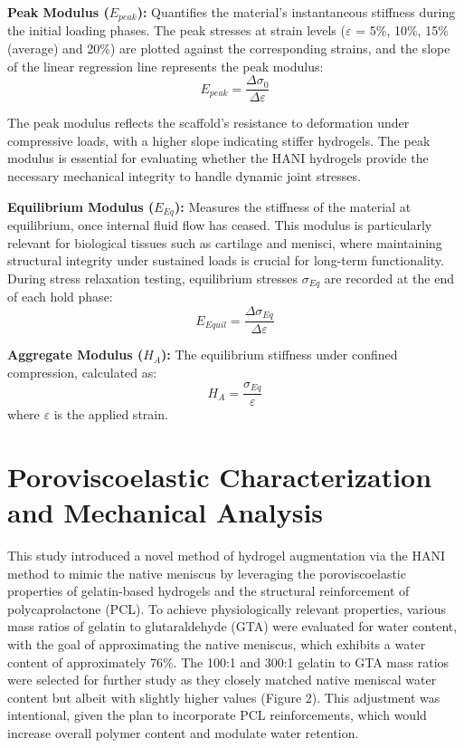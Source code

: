 \textbf{Peak Modulus ($E_{peak}$):} Quantifies the material's instantaneous stiffness during the initial loading phases. The peak stresses at strain levels ($\varepsilon$ = 5\%, 10\%, 15\%(average) and 20\%) are plotted against the corresponding strains, and the slope of the linear regression line represents the peak modulus:
\begin{equation}
E_{peak} = \frac{\Delta\sigma_{0}}{\Delta\varepsilon}
\end{equation}

The peak modulus reflects the scaffold's resistance to deformation under compressive loads, with a higher slope indicating stiffer hydrogels. The peak modulus is essential for evaluating whether the HANI hydrogels provide the necessary mechanical integrity to handle dynamic joint stresses.

\textbf{Equilibrium Modulus ($E_{Eq}$):} Measures the stiffness of the material at equilibrium, once internal fluid flow has ceased. This modulus is particularly relevant for biological tissues such as cartilage and menisci, where maintaining structural integrity under sustained loads is crucial for long-term functionality. During stress relaxation testing, equilibrium stresses $\sigma_{Eq}$ are recorded at the end of each hold phase:
\begin{equation}
E_{Equil} = \frac{\Delta\sigma_{Eq}}{\Delta\varepsilon}
\end{equation}

\textbf{Aggregate Modulus ($H_A$):} The equilibrium stiffness under confined compression, calculated as:
\begin{equation}
H_A = \frac{\sigma_{Eq}}{\varepsilon}
\end{equation}
where $\varepsilon$ is the applied strain.

\clearpage
\section{Poroviscoelastic Characterization and Mechanical Analysis}

This study introduced a novel method of hydrogel augmentation via the HANI method to mimic the native meniscus by leveraging the poroviscoelastic properties of gelatin-based hydrogels and the structural reinforcement of polycaprolactone (PCL). To achieve physiologically relevant properties, various mass ratios of gelatin to glutaraldehyde (GTA) were evaluated for water content, with the goal of approximating the native meniscus, which exhibits a water content of approximately 76\%. The 100:1 and 300:1 gelatin to GTA mass ratios were selected for further study as they closely matched native meniscal water content but albeit with slightly higher values (Figure 2). This adjustment was intentional, given the plan to incorporate PCL reinforcements, which would increase overall polymer content and modulate water retention.\\[0pt]

